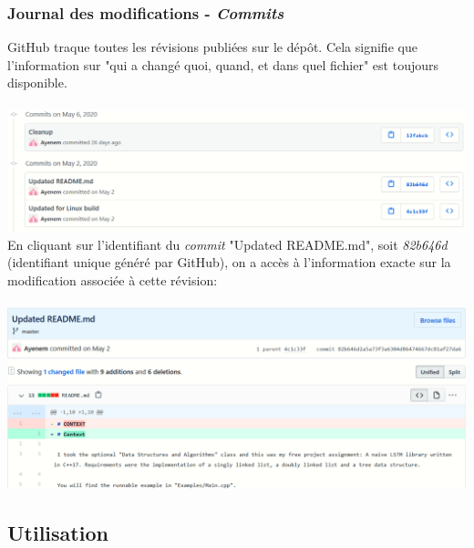 \documentclass{article}
\begin{document}
\subsubsection{Journal des modifications - \textit{Commits}}
GitHub traque toutes les révisions publiées sur le dépôt. Cela signifie que l'information sur "qui a changé quoi, quand, et dans quel fichier" est toujours disponible.\\\\
\includegraphics[width=1\textwidth, center]{ChangeLog}
En cliquant sur l'identifiant du \textit{commit} "Updated README.md", soit \textit{82b646d} (identifiant unique généré par GitHub), on a accès à l'information exacte sur la modification associée à cette révision:\\\\
\includegraphics[width=1\textwidth, center]{README_Update}

\subsection{Utilisation}
\end{document}
